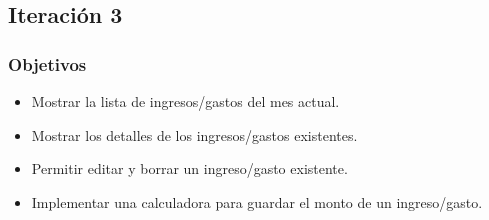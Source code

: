 \subsection{Iteración 3}
\subsubsection{Objetivos}
\begin{itemize}
\item Mostrar la lista de ingresos/gastos del mes actual.
\item Mostrar los detalles de los ingresos/gastos existentes.
\item Permitir editar y borrar un ingreso/gasto existente.
\item Implementar una calculadora para guardar el monto de un ingreso/gasto.
\end{itemize}


